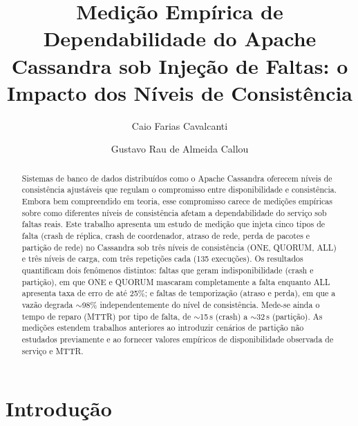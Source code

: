 \documentclass[runningheads]{llncs}
\begin{document}
\title{Medição Empírica de Dependabilidade do Apache Cassandra sob
Injeção de Faltas: o Impacto dos Níveis de Consistência}

\author{Caio Farias Cavalcanti \and
Gustavo Rau de Almeida Callou}

\maketitle

\begin{abstract}
Sistemas de banco de dados distribuídos como o Apache Cassandra oferecem níveis
de consistência ajustáveis que regulam o compromisso entre disponibilidade e
consistência. Embora bem compreendido em teoria, esse compromisso carece de
medições empíricas sobre como diferentes níveis de consistência afetam a
dependabilidade do serviço sob faltas reais. Este trabalho apresenta um estudo
de medição que injeta cinco tipos de falta (crash de réplica, crash de
coordenador, atraso de rede, perda de pacotes e partição de rede) no Cassandra sob
três níveis de consistência (ONE, QUORUM, ALL) e três níveis de carga, com três
repetições cada (135 execuções). Os resultados
quantificam dois fenômenos distintos: faltas que geram indisponibilidade (crash
e partição), em que ONE e QUORUM mascaram completamente a falta enquanto ALL
apresenta taxa de erro de até 25\%; e faltas de temporização (atraso e perda),
em que a vazão degrada $\sim$98\% independentemente do nível de consistência.
Mede-se ainda o tempo de reparo (MTTR) por tipo de falta, de $\sim$15\,s (crash)
a $\sim$32\,s (partição). As medições estendem trabalhos anteriores ao
introduzir cenários de partição não estudados previamente e ao fornecer valores
empíricos de disponibilidade observada de serviço e MTTR.

\end{abstract}

\section{Introdução}
\end{document}
